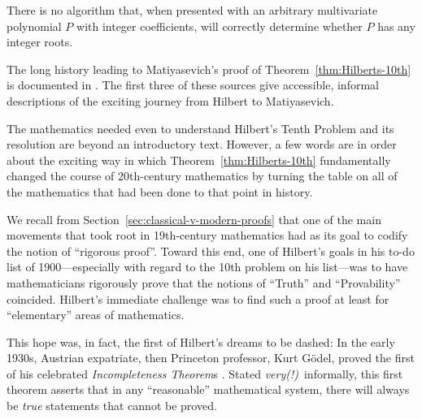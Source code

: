\bigskip

\noindent {}

\bigskip

\begin{theorem}
\label{thm:Hilberts-10th}
There is no algorithm that, when presented with an arbitrary multivariate polynomial $P$ with integer coefficients, will correctly determine whether $P$ has any integer roots.
\end{theorem}

The long history leading to Matiyasevich's proof of Theorem~\ref{thm:Hilberts-10th} is documented in \cite{Davis73,DavisH73,DavisMR76,Matiyasevich93}.  The first three of these sources give accessible, informal descriptions of the exciting journey from Hilbert to Matiyasevich.

\medskip

The mathematics needed even to understand Hilbert's Tenth Problem and its resolution are beyond an introductory text.  However, a few words are in order about the exciting way in which Theorem~\ref{thm:Hilberts-10th} fundamentally changed the course of 20th-century mathematics by turning the table on all of the mathematics that had been done to that point in history.

\medskip

We recall from Section~\ref{sec:classical-v-modern-proofs} that one of the main movements that took root in 19th-century mathematics had as its goal to codify the notion of ``rigorous proof''.  Toward this end, one of Hilbert's goals in his to-do list of 1900---especially with regard to the 10th problem on his list---was to have mathematicians rigorously prove that the notions of ``Truth'' and ``Provability'' coincided.  Hilbert's immediate challenge was to find such a proof at least for ``elementary'' areas of mathematics.

\smallskip

 

This hope was, in fact, the first of Hilbert's dreams to be dashed: In the early 1930s, Austrian expatriate, then Princeton professor, Kurt G\"{o}del, proved the first of his celebrated {\it Incompleteness Theorem}s \cite{Goedel31}.  Stated {\em very(!)}~informally, this first theorem asserts that in any ``reasonable'' mathematical system, there will always be {\em true} statements that cannot be proved.

